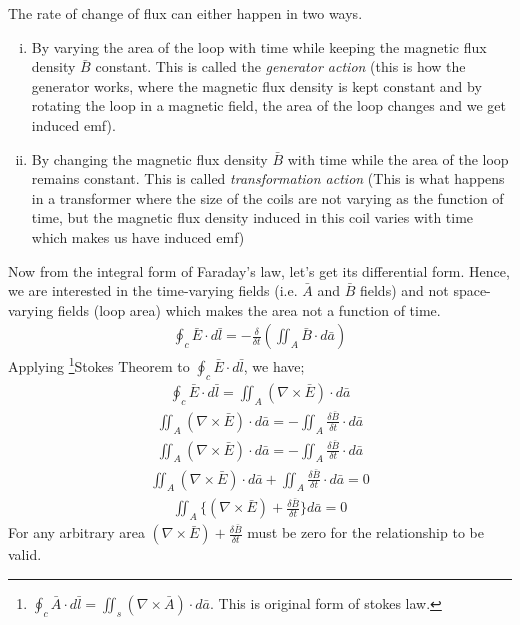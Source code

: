 The rate of change of flux can either happen in two ways.
\begin{enumerate}[(i)]
\item By varying the area of the loop with time while keeping the magnetic flux density $\bar{B}$ constant. This is called the \emph{generator action} (this is how the generator works, where the magnetic flux density is kept constant and by rotating the loop in a magnetic field, the area of the loop changes and we get induced emf).
\item By changing the magnetic flux density $\bar{B}$ with time while the area of the loop remains constant. This is called \emph{transformation action} (This is what happens in a transformer where the size of the coils are not varying as the function of time, but the magnetic flux density induced in this coil varies with time which makes us have induced emf)
\end{enumerate}
Now from the integral form of Faraday's law, let's get its differential form. Hence, we are interested in the time-varying fields (i.e. $\bar{A}$ and $\bar{B}$ fields) and not space-varying fields (loop area) which makes the area not a function of time.
\begin{align*}
{\oint_c\bar{E}\cdot d\bar{l} = -\frac{\delta}{\delta t}(\iint_A\bar{B}\cdot d\bar{a})}
\end{align*}	
Applying \footnote[10]{$\oint_c\bar{A}\cdot d\bar{l} = \iint_s(\nabla \times \bar{A})\cdot d\bar{a}$. This is original form of stokes law.}Stokes Theorem to $\oint_c\bar{E}\cdot d\bar{l}$, we have;
\begin{align*}
\oint_c\bar{E}\cdot d\bar{l} = \iint_A(\nabla\times\bar{E})\cdot d\bar{a}
\end{align*}
\begin{align*}
\iint_A(\nabla\times\bar{E})\cdot d\bar{a} = -\iint_A\frac{\delta \bar{B}}{\delta t}\cdot d\bar{a}
\end{align*}
\begin{align*}
\iint_A(\nabla\times\bar{E})\cdot d\bar{a} = -\iint_A\frac{\delta \bar{B}}{\delta t}\cdot d\bar{a}
\end{align*}
\begin{align*}
\iint_A(\nabla\times\bar{E})\cdot d\bar{a} + \iint_A\frac{\delta \bar{B}}{\delta t}\cdot d\bar{a} = 0
\end{align*}
\begin{align*}
\iint_A\{(\nabla \times \bar{E})+ \frac{\delta \bar{B}}{\delta t}\} d\bar{a} = 0
\end{align*} 
For any arbitrary area $(\nabla \times \bar{E})+ \frac{\delta \bar{B}}{\delta t}$ must be zero for the relationship to be valid.


